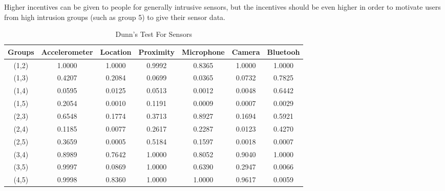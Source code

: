 Higher incentives can be given to people for generally intrusive sensors, but the incentives should be even higher in order to motivate users from high intrusion groups (such as group 5) to give their sensor data. 


\begin{table}[h!]
  \centering
  \caption{Dunn's Test For Sensors}
  \label{tab:dunn_sensors}
  \begin{tabular}{ccccccc}
    \toprule
     Groups & Accelerometer & Location & Proximity & Microphone & Camera & Bluetooh \\
    \midrule
    (1,2) & 1.0000 & 1.0000 & 0.9992 & 0.8365 & 1.0000 & 1.0000 \\
    (1,3) & 0.4207 & 0.2084 & 0.0699 & 0.0365 & 0.0732 & 0.7825 \\
    (1,4) & 0.0595 & 0.0125 & 0.0513 & 0.0012 & 0.0048 & 0.6442 \\
    (1,5) & 0.2054 & 0.0010 & 0.1191 & 0.0009 & 0.0007 & 0.0029 \\
    (2,3) & 0.6548 & 0.1774 & 0.3713 & 0.8927 & 0.1694 & 0.5921 \\
    (2,4) & 0.1185 & 0.0077 & 0.2617 & 0.2287 & 0.0123 & 0.4270 \\
    (2,5) & 0.3659 & 0.0005 & 0.5184 & 0.1597 & 0.0018 & 0.0007 \\
    (3,4) & 0.8989 & 0.7642 & 1.0000 & 0.8052 & 0.9040 & 1.0000 \\
    (3,5) & 0.9997 & 0.0869 & 1.0000 & 0.6390 & 0.2947 & 0.0066 \\
    (4,5) & 0.9998 & 0.8360 & 1.0000 & 1.0000 & 0.9617 & 0.0059 \\
    \bottomrule
  \end{tabular}
\end{table} 


